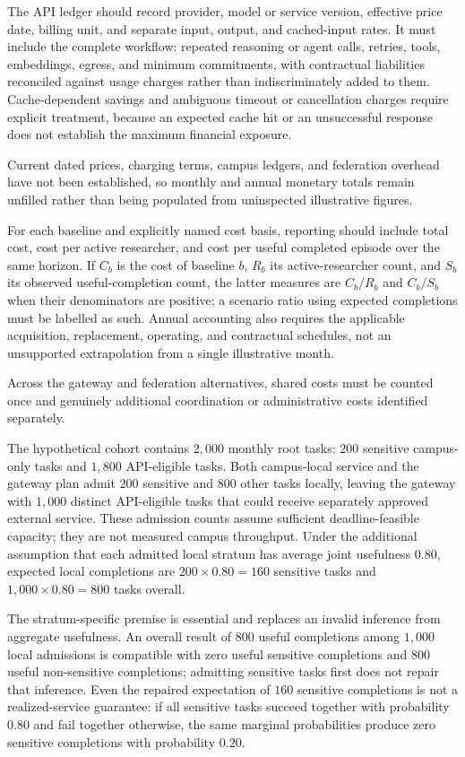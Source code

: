 \documentclass[11pt]{article}
\begin{document}
The API ledger should record provider, model or service version, effective price date, billing unit, and separate input, output, and cached-input rates. It must include the complete workflow: repeated reasoning or agent calls, retries, tools, embeddings, egress, and minimum commitments, with contractual liabilities reconciled against usage charges rather than indiscriminately added to them. Cache-dependent savings and ambiguous timeout or cancellation charges require explicit treatment, because an expected cache hit or an unsuccessful response does not establish the maximum financial exposure.

Current dated prices, charging terms, campus ledgers, and federation overhead have not been established, so monthly and annual monetary totals remain unfilled rather than being populated from uninspected illustrative figures.

For each baseline and explicitly named cost basis, reporting should include total cost, cost per active researcher, and cost per useful completed episode over the same horizon. If $C_b$ is the cost of baseline $b$, $R_b$ its active-researcher count, and $S_b$ its observed useful-completion count, the latter measures are $C_b/R_b$ and $C_b/S_b$ when their denominators are positive; a scenario ratio using expected completions must be labelled as such. Annual accounting also requires the applicable acquisition, replacement, operating, and contractual schedules, not an unsupported extrapolation from a single illustrative month.

Across the gateway and federation alternatives, shared costs must be counted once and genuinely additional coordination or administrative costs identified separately.

The hypothetical cohort contains $2{,}000$ monthly root tasks: $200$ sensitive campus-only tasks and $1{,}800$ API-eligible tasks. Both campus-local service and the gateway plan admit $200$ sensitive and $800$ other tasks locally, leaving the gateway with $1{,}000$ distinct API-eligible tasks that could receive separately approved external service. These admission counts assume sufficient deadline-feasible capacity; they are not measured campus throughput. Under the additional assumption that each admitted local stratum has average joint usefulness $0.80$, expected local completions are $200\times0.80=160$ sensitive tasks and $1{,}000\times0.80=800$ tasks overall.

The stratum-specific premise is essential and replaces an invalid inference from aggregate usefulness. An overall result of $800$ useful completions among $1{,}000$ local admissions is compatible with zero useful sensitive completions and $800$ useful non-sensitive completions; admitting sensitive tasks first does not repair that inference. Even the repaired expectation of $160$ sensitive completions is not a realized-service guarantee: if all sensitive tasks succeed together with probability $0.80$ and fail together otherwise, the same marginal probabilities produce zero sensitive completions with probability $0.20$.
\end{document}
